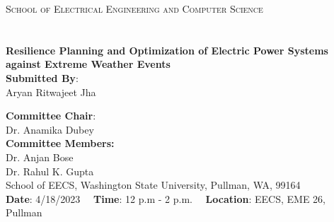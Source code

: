 \documentclass[hidelinks, 12pt]{article}
\begin{document}
\begin{titlepage}
\textsc{\large School of Electrical Engineering and Computer Science}\\[1.5cm] %
\textsc{\large {}}\\ %


\HRule \\
{ \Large \bfseries Resilience Planning and Optimization of Electric Power Systems against Extreme Weather Events}
\vspace{0.2 cm}
\HRule \\
 


\medskip
\large
{{\textbf{Submitted By}:\\ Aryan Ritwajeet Jha }}\\ [0.5cm]

\medskip

\textbf{Committee Chair}:\\ Dr. Anamika Dubey \\ [0.5 cm]
\textbf{Committee Members:} \\ Dr. Anjan Bose\\
Dr. Rahul K. Gupta\\

\vspace{1.5 cm}
\small School of EECS, Washington State University, Pullman, WA, 99164\\

\vspace{1.0 cm}
\small
\textbf{Date}: 4/18/2023 \ \ \textbf{Time}: 12 p.m - 2 p.m. \ \ \textbf{Location}: EECS, EME 26, Pullman


\vfill %
\end{titlepage}

\newpage
\end{document}
